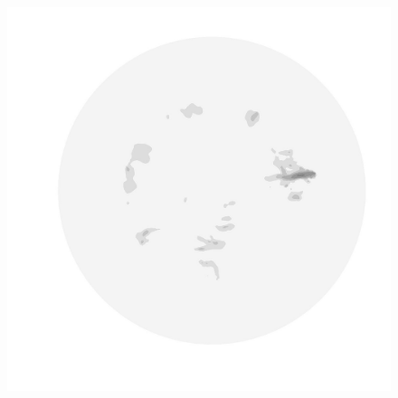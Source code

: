 \begin{figure}
\begin{minipage}[b]{0.30\linewidth}
  \end{minipage}
  \quad
  \begin{minipage}[b]{0.30\linewidth}
    \includegraphics[width=1.0\textwidth]{images/EISMINT_II/Ubar/U_mag_2000.jpg}
  \end{minipage}
  

\end{figure}
